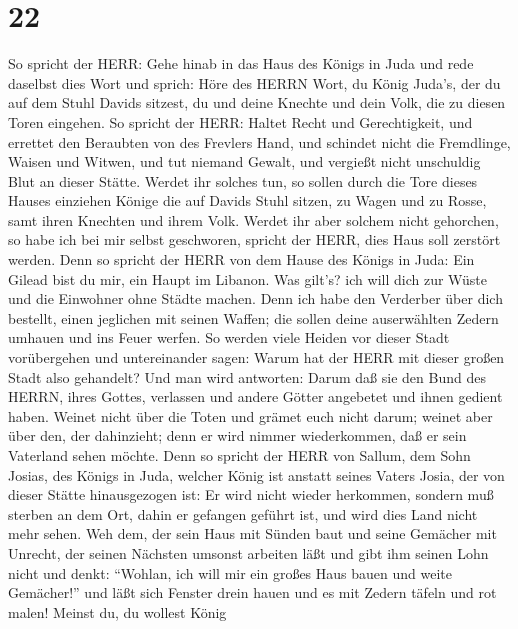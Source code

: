 \hypertarget{section-21}{%
\section{22}\label{section-21}}

 So spricht der HERR: Gehe hinab in das Haus des Königs in
Juda und rede daselbst dies Wort  und sprich: Höre des HERRN
Wort, du König Juda's, der du auf dem Stuhl Davids sitzest, du und deine
Knechte und dein Volk, die zu diesen Toren eingehen.  So
spricht der HERR: Haltet Recht und Gerechtigkeit, und errettet den
Beraubten von des Frevlers Hand, und schindet nicht die Fremdlinge,
Waisen und Witwen, und tut niemand Gewalt, und vergießt nicht unschuldig
Blut an dieser Stätte.  Werdet ihr solches tun, so sollen
durch die Tore dieses Hauses einziehen Könige die auf Davids Stuhl
sitzen, zu Wagen und zu Rosse, samt ihren Knechten und ihrem Volk.
 Werdet ihr aber solchem nicht gehorchen, so habe ich bei
mir selbst geschworen, spricht der HERR, dies Haus soll zerstört werden.
 Denn so spricht der HERR von dem Hause des Königs in Juda:
Ein Gilead bist du mir, ein Haupt im Libanon. Was gilt's? ich will dich
zur Wüste und die Einwohner ohne Städte machen.  Denn ich
habe den Verderber über dich bestellt, einen jeglichen mit seinen
Waffen; die sollen deine auserwählten Zedern umhauen und ins Feuer
werfen.  So werden viele Heiden vor dieser Stadt
vorübergehen und untereinander sagen: Warum hat der HERR mit dieser
großen Stadt also gehandelt?  Und man wird antworten: Darum
daß sie den Bund des HERRN, ihres Gottes, verlassen und andere Götter
angebetet und ihnen gedient haben.  Weinet nicht über die
Toten und grämet euch nicht darum; weinet aber über den, der dahinzieht;
denn er wird nimmer wiederkommen, daß er sein Vaterland sehen möchte.
 Denn so spricht der HERR von Sallum, dem Sohn Josias, des
Königs in Juda, welcher König ist anstatt seines Vaters Josia, der von
dieser Stätte hinausgezogen ist: Er wird nicht wieder herkommen,
 sondern muß sterben an dem Ort, dahin er gefangen geführt
ist, und wird dies Land nicht mehr sehen.  Weh dem, der
sein Haus mit Sünden baut und seine Gemächer mit Unrecht, der seinen
Nächsten umsonst arbeiten läßt und gibt ihm seinen Lohn nicht
 und denkt: ``Wohlan, ich will mir ein großes Haus bauen
und weite Gemächer!'' und läßt sich Fenster drein hauen und es mit
Zedern täfeln und rot malen!  Meinst du, du wollest König
